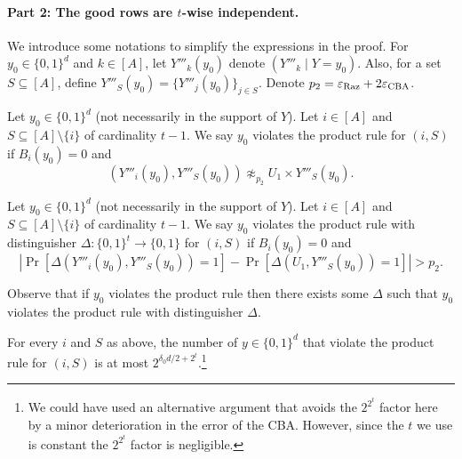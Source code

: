\paragraph{Part 2: The good rows are $t$-wise independent.}
We introduce some notations to simplify the expressions in the proof. For $y_0\in\{0,1\}^d$ and $k\in[A]$, let $Y'''_k(y_0)$ denote $(Y'''_k\mid Y=y_0)$. Also, for a set $S\subseteq[A]$, define $Y'''_S(y_0)=\{Y'''_j(y_0)\}_{j\in S}$. Denote $p_2=\varepsilon_{\rm Raz}+2\varepsilon_{\rm CBA}$.
\begin{definition}
Let $y_0\in\{0,1\}^d$ (not necessarily in the support of $Y$). Let $i\in[A]$ and $S\subseteq[A]\setminus\{i\}$ of cardinality $t-1$. We say $y_0$ violates the product rule for $(i,S)$ if $B_i(y_0)=0$ and
\[(Y'''_i(y_0),Y'''_S(y_0))\not\approx_{p_2}U_1\times Y'''_S(y_0).\]
\end{definition}
\begin{definition}
Let $y_0\in\{0,1\}^d$ (not necessarily in the support of $Y$). Let $i\in[A]$ and $S\subseteq[A]\setminus\{i\}$ of cardinality $t-1$. We say $y_0$ violates the product rule with distinguisher $\Delta:\{0,1\}^t\to\{0,1\}$ for $(i,S)$ if $B_i(y_0)=0$ and
\[\left|\Pr[\Delta(Y'''_i(y_0),Y'''_S(y_0))=1]-\Pr[\Delta(U_1,Y'''_S(y_0))=1]\right|>p_2.\]
\end{definition}
Observe that if $y_0$ violates the product rule then there exists some $\Delta$ such that $y_0$ violates the product rule with distinguisher $\Delta$.
\begin{lemma}
For every $i$ and $S$ as above, the number of $y\in\{0,1\}^d$ that violate the product rule for $(i,S)$ is at most $2^{\delta_0d/2+2^t}$.\footnote{We could have used an alternative argument that avoids the $2^{2^t}$ factor here by a minor deterioration in the error of the CBA. However, since the $t$ we use is constant the $2^{2^t}$ factor is negligible.}
\end{lemma}
